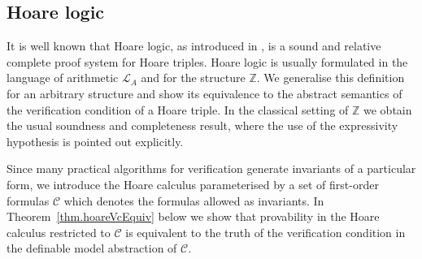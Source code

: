 \documentclass[acmsmall]{acmart}
\theoremstyle{plain}
\theoremstyle{definition}
\newtheorem{definition}[theorem]{Definition}
\newcommand{\calL}{\mathcal{L}}
\newcommand{\calM}{\mathcal{M}}
\newcommand{\calC}{\mathcal{C}}
\newcommand{\Int}{\mathbb{Z}}
\newcommand{\sop}{[} %
\newcommand{\scl}{]} %
\newcommand{\sel}[2]{#1 \backslash #2} %
\newcommand{\unsubst}[2]{\sop \sel{#1}{#2} \scl} %
\newcommand{\modelsa}{\models_\mathrm{a}} %
\begin{document}
\subsection{Hoare logic}\label{subsect.HoareLogic}

It is well known that Hoare logic, as introduced in \cite{Hoare1969}, is a sound and relative complete proof system for Hoare triples. Hoare logic is usually formulated in the language of arithmetic $\calL_A$ and for the structure $\Int$. We generalise this definition for an arbitrary structure and show its equivalence to the abstract semantics of the verification condition of a Hoare triple. In the classical setting of $\Int$ we obtain the usual soundness and completeness result, where the use of the expressivity hypothesis is pointed out explicitly.

Since many practical algorithms for verification generate invariants of a particular form, we introduce
 the Hoare calculus parameterised by a set of first-order formulas $\calC$ which denotes the formulas
 allowed as invariants.
In Theorem~\ref{thm.hoareVcEquiv} below we show that provability in the Hoare calculus restricted to $\calC$
 is equivalent to the truth of the verification condition in the definable model abstraction of $\calC$.

\end{document}
